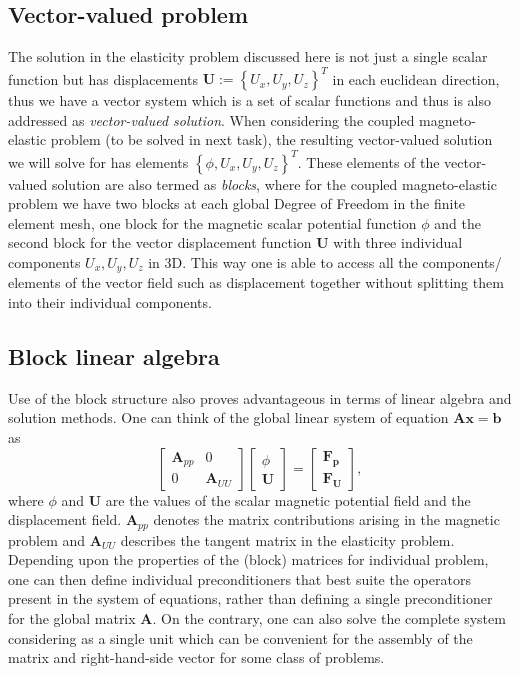 \documentclass[11pt,a4paper,final]{article}
\begin{document}
\subsection{\textbf{Vector-valued problem}} The solution in the elasticity problem discussed here is not just a single scalar function but has displacements $\mathbf{U} := \left\lbrace U_x, U_y, U_z \right\rbrace^T$ in each euclidean direction, thus we have a vector system which is a set of scalar functions and thus is also addressed as \textit{vector-valued solution}. When considering the coupled magneto-elastic problem (to be solved in next task), the resulting vector-valued solution we will solve for has elements $\left\lbrace \phi, U_x, U_y, U_z \right\rbrace^T$. These elements of the vector-valued solution are also termed as \textit{blocks}, where for the coupled magneto-elastic problem we have two blocks at each global Degree of Freedom in the finite element mesh, one block for the magnetic scalar potential function $\phi$ and the second block for the vector displacement function $\mathbf{U}$ with three individual components $U_x, U_y, U_z$ in 3D. This way one is able to access all the components/ elements of the vector field such as displacement together without splitting them into their individual components. 
\subsection{\textbf{Block linear algebra}} Use of the block structure also proves advantageous in terms of linear algebra and solution methods. One can think of the global linear system of equation $\mathbf{A}\mathbf{x} = \mathbf{b}$ as
\begin{equation*}
\begin{bmatrix}
\mathbf{A}_{pp} & 0 \\
0 & \mathbf{A}_{UU} 
\end{bmatrix}
\begin{bmatrix}
\phi \\
\mathbf{U}
\end{bmatrix} 
= 
\begin{bmatrix}
\mathbf{F_p} \\
\mathbf{F_U}
\end{bmatrix},
\end{equation*}
where $\phi$ and $\mathbf{U}$ are the values of the scalar magnetic potential field and the displacement field. $\mathbf{A}_{pp}$ denotes the matrix contributions arising in the magnetic problem and $\mathbf{A}_{UU}$ describes the tangent matrix in the elasticity problem. Depending upon the properties of the (block) matrices for individual problem, one can then define individual preconditioners that best suite the operators present in the system of equations, rather than defining a single preconditioner for the global matrix $\mathbf{A}$. On the contrary, one can also solve the complete system considering as a single unit which can be convenient for the assembly of the matrix and right-hand-side vector for some class of problems. 
\end{document}
